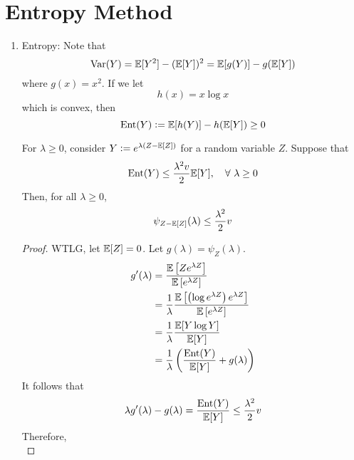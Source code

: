 \section{Entropy Method}
\begin{enumerate}[label=\arabic{*}.]
	\item Entropy: Note that
	\begin{equation*}
		\operatorname{Var}(Y) = \mathbb{E}[Y^2] - (\mathbb{E}[Y])^2 = \mathbb{E}[g(Y)] - g(\mathbb{E}[Y])
	\end{equation*}
	where $g(x) = x^2$. If we let
	\begin{equation*}
		h(x) = x \log x
	\end{equation*}
	which is convex, then 
	\begin{equation*}
		\operatorname{Ent}(Y) \vcentcolon= \mathbb{E}[h(Y)] - h(\mathbb{E}[Y]) \geq 0
	\end{equation*}
	\begin{lem}
	    For $\lambda \geq 0$, consider $Y \vcentcolon= e^{\lambda (Z - \mathbb{E}[Z])}$ for a random variable $Z$. Suppose that
	    \begin{equation*}
	    	\operatorname{Ent}(Y) \leq \frac{\lambda^2 v}{2}\mathbb{E}[Y],\quad \forall~ \lambda \geq 0
	    \end{equation*}
	    Then, for all $\lambda \geq 0$,
	    \begin{equation*}
	    	\psi_{Z-\mathbb{E}[Z]}(\lambda) \leq \frac{\lambda^2}{2}v
	    \end{equation*}
	\end{lem}
	\begin{proof}
		WTLG, let $\mathbb{E}[Z] = 0$. Let $g(\lambda) = \psi_{Z}(\lambda)$.
	    \begin{equation*}
	    	\begin{aligned}
	    		g^\prime(\lambda) &= \frac{\mathbb{E}\left[Ze^{\lambda Z}\right]}{\mathbb{E}\left[e^{\lambda Z}\right]} \\
	    		&= \frac{1}{\lambda}\frac{\mathbb{E}\left[\left(\log e^{\lambda Z}\right) e^{\lambda Z}\right]}{\mathbb{E}\left[e^{\lambda Z}\right]} \\
	    		&=\frac{1}{\lambda} \frac{\mathbb{E}[Y\log Y]}{\mathbb{E}[Y]}\\
	    		&= \frac{1}{\lambda} \left(\frac{\operatorname{Ent}(Y)}{\mathbb{E}[Y]} + g(\lambda)\right)
	    	\end{aligned}
	    \end{equation*}
	    It follows that
	    \begin{equation*}
	    	\lambda g^\prime(\lambda) - g(\lambda)= \frac{\operatorname{Ent}(Y)}{\mathbb{E}[Y]}  \leq \frac{\lambda^2}{2}v
	    \end{equation*}
	    Therefore,
	    \begin{equation*}

\end{equation*}
\end{proof}
\end{enumerate}
